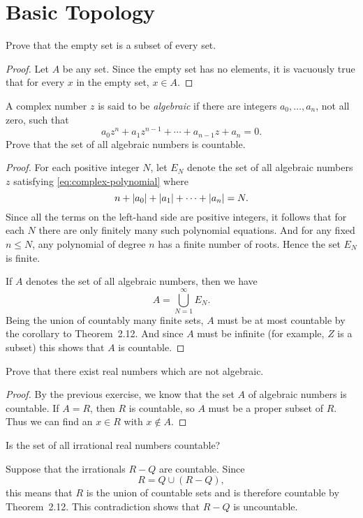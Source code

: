 \chapter{Basic Topology}

 Prove that the empty set is a subset of every set.
\begin{proof}
  Let $A$ be any set. Since the empty set has no elements, it is
  vacuously true that for every $x$ in the empty set, $x\in A$.
\end{proof}

 A complex number $z$ is said to be {\em algebraic} if there
are integers $a_0,\dots,a_n$, not all zero, such that
\begin{equation}
  \label{eq:complex-polynomial}
  a_0z^n + a_1z^{n-1} + \cdots + a_{n-1}z + a_n = 0.
\end{equation}
Prove that the set of all algebraic numbers is countable.
\begin{proof}
  For each positive integer $N$, let $E_N$ denote the set of all
  algebraic numbers $z$ satisfying \eqref{eq:complex-polynomial} where
  \begin{equation*}
    n + \lvert{a_0}\rvert + \lvert{a_1}\rvert + \cdots + \lvert{a_n}\rvert = N.
  \end{equation*}
  Since all the terms on the left-hand side are positive integers, it
  follows that for each $N$ there are only finitely many such
  polynomial equations.  And for any fixed $n\leq N$, any polynomial
  of degree $n$ has a finite number of roots. Hence the set $E_N$ is
  finite.

  If $A$ denotes the set of all algebraic numbers, then we have
  \begin{equation*}
    A = \bigcup_{N=1}^\infty E_N.
  \end{equation*}
  Being the union of countably many finite sets, $A$ must be at most
  countable by the corollary to Theorem~2.12. And since $A$ must be
  infinite (for example, $Z$ is a subset) this shows that $A$ is
  countable.
\end{proof}

 Prove that there exist real numbers which are not
algebraic.
\begin{proof}
  By the previous exercise, we know that the set $A$ of algebraic
  numbers is countable. If $A = R$, then $R$ is countable, so $A$ must
  be a proper subset of $R$. Thus we can find an $x\in R$ with
  $x\not\in A$.
\end{proof}

 Is the set of all irrational real numbers countable?
\begin{solution}
  Suppose that the irrationals $R-Q$ are countable. Since
  \begin{equation*}
    R = Q\cup(R-Q),
  \end{equation*}
  this means that $R$ is the union of countable sets and is therefore
  countable by Theorem~2.12. This contradiction shows that $R-Q$ is
  uncountable.
\end{solution}

